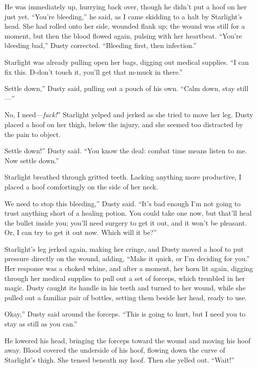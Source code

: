 He was immediately up, hurrying back over, though he didn’t put a hoof on her just yet. “You’re bleeding,” he said, as I came skidding to a halt by Starlight’s head. She had rolled onto her side, wounded flank up; the wound was still for a moment, but then the blood flowed again, pulsing with her heartbeat. “You’re bleeding bad,” Dusty corrected. “Bleeding first, then infection.”

Starlight was already pulling open her bags, digging out medical supplies. “I can fix this. D-don’t touch it, you’ll get that m-muck in there.”

\leavevmode{}Settle down,” Dusty said, pulling out a pouch of his own. “Calm down, stay still—”

\leavevmode{}No, I need—\textit{fuck!}” Starlight yelped and jerked as she tried to move her leg. Dusty placed a hoof on her thigh, below the injury, and she seemed too distracted by the pain to object.

\leavevmode{}Settle down!” Dusty said. “You know the deal: combat time means listen to me. Now settle down.”

Starlight breathed through gritted teeth. Lacking anything more productive, I placed a hoof comfortingly on the side of her neck.

\leavevmode{}We need to stop this bleeding,” Dusty said. “It’s bad enough I’m not going to trust anything short of a healing potion. You could take one now, but that’ll heal the bullet inside you; you’ll need surgery to get it out, and it won’t be pleasant. Or, I can try to get it out now. Which will it be?”

Starlight’s leg jerked again, making her cringe, and Dusty moved a hoof to put pressure directly on the wound, adding, “Make it quick, or I’m deciding for you.” Her response was a choked whine, and after a moment, her horn lit again, digging through her medical supplies to pull out a set of forceps, which trembled in her magic. Dusty caught its handle in his teeth and turned to her wound, while she pulled out a familiar pair of bottles, setting them beside her head, ready to use.

\leavevmode{}Okay,” Dusty said around the forceps. “This is going to hurt, but I need you to stay as still as you can.”

He lowered his head, bringing the forceps toward the wound and moving his hoof away. Blood covered the underside of his hoof, flowing down the curve of Starlight’s thigh. She tensed beneath my hoof. Then she yelled out. “Wait!”

